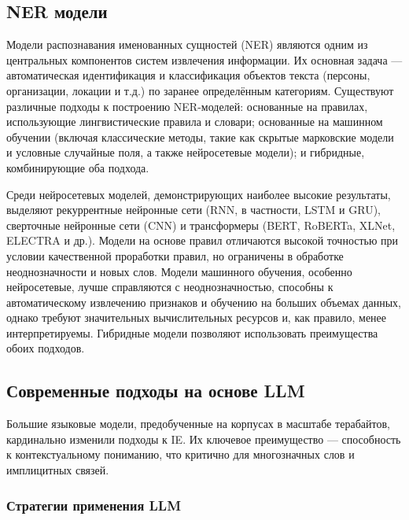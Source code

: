 \subsection{NER модели}

Модели распознавания именованных сущностей (NER) являются одним из центральных компонентов систем извлечения информации. 
Их основная задача — автоматическая идентификация и классификация объектов текста (персоны, организации, локации и т.д.) по заранее определённым категориям.
Существуют различные подходы к построению NER-моделей: основанные на правилах, использующие лингвистические правила и словари; основанные на машинном обучении (включая классические методы, такие как скрытые марковские модели и условные случайные поля, а также нейросетевые модели); и гибридные, комбинирующие оба подхода.

Среди нейросетевых моделей, демонстрирующих наиболее высокие результаты, выделяют рекуррентные нейронные сети (RNN, в частности, LSTM и GRU), 
сверточные нейронные сети (CNN) и трансформеры (BERT, RoBERTa, XLNet, ELECTRA и др.). 
Модели на основе правил отличаются высокой точностью при условии качественной проработки правил, но ограничены в обработке неоднозначности и новых слов. 
Модели машинного обучения, особенно нейросетевые, лучше справляются с неоднозначностью, способны к автоматическому извлечению признаков и обучению на больших объемах данных, однако требуют значительных вычислительных ресурсов и, как правило, менее интерпретируемы. 
Гибридные модели позволяют использовать преимущества обоих подходов.

\subsection{Современные подходы на основе LLM}

Большие языковые модели, предобученные на корпусах в масштабе терабайтов, кардинально изменили подходы к IE. Их ключевое преимущество — способность к контекстуальному пониманию, что критично для многозначных слов и имплицитных связей.

\subsubsection{Стратегии применения LLM}

